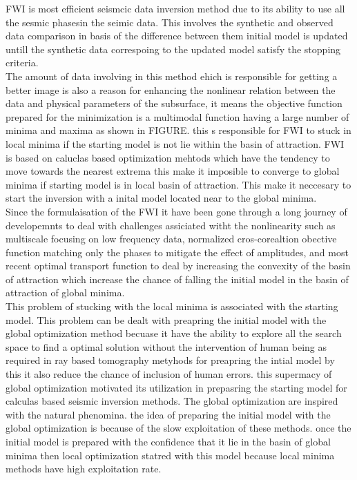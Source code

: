 \documentclass[paper,revised]{geophysics}
\begin{document}
FWI is most efficient seismcic data inversion method due to its ability to use all the sesmic phasesin the seimic data. This involves the synthetic and observed data comparison in basis of the difference between them initial model is updated untill the synthetic data correspoing to the updated model satisfy the stopping criteria. 
\\
The amount of data involving in this method ehich is responsible for getting a better image is also a reason for enhancing the nonlinear relation between the data and physical parameters of the subsurface, it means the objective function prepared for the minimization is a multimodal function having a large number of minima and maxima as shown in FIGURE. this s responsible for FWI to stuck in local minima if the starting model is not lie within the basin of attraction. FWI is based on caluclas based optimization mehtods which have the tendency to move towards the nearest extrema this make it imposible to converge to global minima if starting model is in local basin of attraction. This make it neccesary to start the inversion with a inital model located near to the global minima.
\\
Since the formulaisation of the FWI it have been gone through a long journey of developemnts to deal with challenges assiciated witht the nonlinearity such as multiscale focusing on low frequency data, normalized cros-corealtion obective function matching only the phases to mitigate the effect of amplitudes, and most recent optimal transport function to deal by increasing the convexity of the basin of attraction which increase the chance of falling the initial model in the basin of attraction of global minima. 
\\
This problem of stucking with the local minima is associated with the starting model. This problem can be dealt with preapring the initial model with the global optimization method becuase it have the ability to explore all the search space to find a optimal solution without the intervention of human being as required in ray based tomography metyhods for preapring the intial model by this it also reduce the chance of inclusion of human errors. this supermacy of global optimization motivated its utilization in prepasring the starting model for calculas based seismic inversion methods. The global optimization are inspired with the natural phenomina. the idea of preparing the initial model with the global optimization is because of the slow exploitation of these methods. once the initial model is prepared with the confidence that it lie in the basin of global minima then local optimization statred with this model because local minima methods have high exploitation rate.
\end{document}
